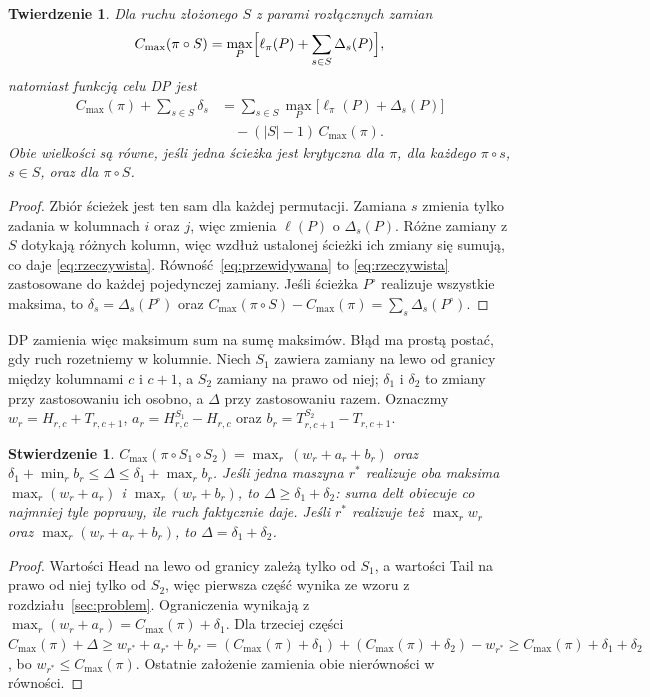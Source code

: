 \documentclass[letterpaper]{article} %
\newtheorem{proposition}{Stwierdzenie}
\newtheorem{theorem}{Twierdzenie}
\theoremstyle{definition}
\begin{document}
\begin{theorem}\label{thm:sciezki}
Dla ruchu złożonego $S$ z parami rozłącznych zamian
\begin{equation}\label{eq:rzeczywista}
C_{\max}(\pi\circ S)=\max_P\Bigl[\ell_\pi(P)+\sum_{s\in S}\Delta_s(P)\Bigr],
\end{equation}
natomiast funkcją celu DP jest
\begin{equation}\label{eq:przewidywana}
\begin{split}
C_{\max}(\pi)+\sum_{s\in S}\delta_s
&=\sum_{s\in S}\max_P\bigl[\ell_\pi(P)+\Delta_s(P)\bigr]\\
&\quad-(|S|-1)\,C_{\max}(\pi).
\end{split}
\end{equation}
Obie wielkości są równe, jeśli jedna ścieżka jest krytyczna dla $\pi$,
dla każdego $\pi\circ s$, $s\in S$, oraz dla $\pi\circ S$.
\end{theorem}
\begin{proof}
Zbiór ścieżek jest ten sam dla każdej permutacji. Zamiana $s$ zmienia
tylko zadania w kolumnach $i$ oraz $j$, więc zmienia $\ell(P)$
o $\Delta_s(P)$. Różne zamiany z $S$ dotykają różnych kolumn, więc
wzdłuż ustalonej ścieżki ich zmiany się sumują, co daje
\eqref{eq:rzeczywista}. Równość~\eqref{eq:przewidywana} to
\eqref{eq:rzeczywista} zastosowane do każdej pojedynczej zamiany. Jeśli
ścieżka $P^\circ$ realizuje wszystkie maksima, to
$\delta_s=\Delta_s(P^\circ)$ oraz
$C_{\max}(\pi\circ S)-C_{\max}(\pi)=\sum_s\Delta_s(P^\circ)$.
\end{proof}

DP zamienia więc maksimum sum na sumę maksimów. Błąd ma prostą postać,
gdy ruch rozetniemy w kolumnie. Niech $S_1$ zawiera zamiany na lewo od
granicy między kolumnami $c$ i $c+1$, a $S_2$ zamiany na prawo od niej;
$\delta_1$ i $\delta_2$ to zmiany przy zastosowaniu ich osobno,
a $\Delta$ przy zastosowaniu razem. Oznaczmy
$w_r=H_{r,c}+T_{r,c+1}$, $a_r=H^{S_1}_{r,c}-H_{r,c}$
oraz $b_r=T^{S_2}_{r,c+1}-T_{r,c+1}$.

\begin{proposition}\label{prop:rozciecie}
$C_{\max}(\pi\circ S_1\circ S_2)=\max_r\,(w_r+a_r+b_r)$ oraz
$\delta_1+\min_r b_r\leq\Delta\leq\delta_1+\max_r b_r$. Jeśli jedna
maszyna $r^\ast$ realizuje oba maksima $\max_r(w_r+a_r)$
i $\max_r(w_r+b_r)$, to $\Delta\geq\delta_1+\delta_2$: suma delt obiecuje
co najmniej tyle poprawy, ile ruch faktycznie daje. Jeśli $r^\ast$
realizuje też $\max_r w_r$ oraz $\max_r(w_r+a_r+b_r)$, to
$\Delta=\delta_1+\delta_2$.
\end{proposition}
\begin{proof}
Wartości Head na lewo od granicy zależą tylko od $S_1$, a wartości Tail
na prawo od niej tylko od $S_2$, więc pierwsza część wynika ze wzoru
z rozdziału~\ref{sec:problem}. Ograniczenia wynikają
z $\max_r(w_r+a_r)=C_{\max}(\pi)+\delta_1$. Dla trzeciej części
$C_{\max}(\pi)+\Delta\geq w_{r^\ast}+a_{r^\ast}+b_{r^\ast}
=(C_{\max}(\pi)+\delta_1)+(C_{\max}(\pi)+\delta_2)-w_{r^\ast}
\geq C_{\max}(\pi)+\delta_1+\delta_2$, bo
$w_{r^\ast}\leq C_{\max}(\pi)$. Ostatnie założenie zamienia obie
nierówności w równości.
\end{proof}
\end{document}
